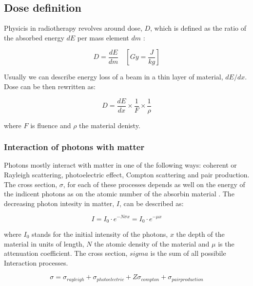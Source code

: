 \documentclass[type=dr, dr=rernat, accentcolor=tud7b,colorbacktitle, bigchapter, openright, twoside, 12pt ]{tudthesis}
\begin{document}
\subsection{Dose definition}

Physicis in radiotherapy revolves around dose, $D$, which is defined as the ratio of the absorbed energy $dE$ per mass element $dm$ \cite{ICRU1993}:

\begin{equation}
 D = \frac{dE}{dm} \quad \left[ Gy = \frac{J}{kg} \right]
\end{equation}

Usually we can describe energy loss of a beam in a thin layer of material, $dE/dx$. Dose can be then rewritten as:

\begin{equation}
 D = \frac{dE}{dx} \times \frac{1}{F} \times \frac{1}{\rho}
\end{equation}

where $F$ is fluence and $\rho$ the material denisty.



\subsubsection{Interaction of photons with matter}

Photons mostly interact with matter in one of the following ways: coherent or Rayleigh scattering, photoelectric effect, Compton scattering and pair production. The cross section, $\sigma$, for each of these processes depends
as well on the energy of the indicent photons as on the atomic number of the absorbin material \cite{Lilley2006}. The decreasing photon intesity in matter, $I$, can be described as:


\begin{equation}
 I = I_{0} \cdot e^{- N \sigma x} = I_{0} \cdot e^{-\mu x}
 \label{expdecrease}
\end{equation} 

where $I_{0}$ stands for the initial intensity of the photons, $x$ the depth of the material in units of length, $N$ the atomic density of the material and $\mu$ is the attenuation coefficient. The cross section, $sigma$ is the sum of all
possibile Interaction processes.

\begin{equation}
{\sigma} = \sigma_{rayleigh} + \sigma_{photoelectric} + Z\sigma_{compton} + \sigma_{pairproduction} 
\end{equation}
\end{document}
